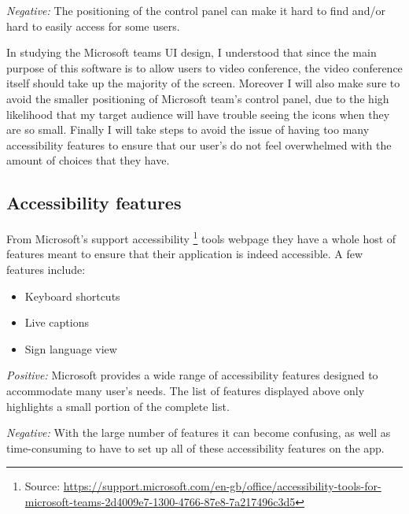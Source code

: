 \textit{Negative:} The positioning of the control panel can 
make it hard to find and/or hard to easily access for some users.\\ \vspace{0.2cm}

In studying the Microsoft teams UI design, I understood that 
since the main purpose of this software is to allow users to 
video conference, the video conference itself should take up 
the majority of the screen. Moreover I will also make sure to 
avoid the smaller positioning of Microsoft team's control 
panel, due to the high likelihood that my target audience 
will have trouble seeing the icons when they are so small. 
Finally I will take steps to avoid the issue of having too 
many accessibility features to ensure that our user's do not
feel overwhelmed with the amount of choices that they have.

\subsection*{Accessibility features}

From Microsoft's support accessibility 
\footnote{Source: 
\url{https://support.microsoft.com/en-gb/office/accessibility-tools-for-microsoft-teams-2d4009e7-1300-4766-87e8-7a217496c3d5}} 
tools webpage they have a whole host of features meant
to ensure that their application is indeed accessible.
A few features include:

\begin{itemize}
  \item Keyboard shortcuts
  \item Live captions  
  \item Sign language view 
\end{itemize}

\textit{Positive:}
Microsoft provides a wide range of accessibility features 
designed to accommodate many user's needs. The list of
features displayed above only highlights a small portion of 
the complete list.
\vspace{0.2cm}

\textit{Negative:}
With the large number of features it can become confusing,
as well as time-consuming to have to set up all of these 
accessibility features on the app.
\vspace{0.2cm}

